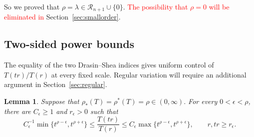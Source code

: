 \documentclass[12pt,letterpaper,reqno]{amsart}
\newtheorem{lem}[thm]{Lemma}
\theoremstyle{definition}
\numberwithin{equation}{section}
\newcommand{\revision}[1]{\textcolor{red}{#1}}
\begin{document}
So we proved that $\rho=\lambda\in {\mathcal R_{n+1}}\cup\{0\}$.
\revision{The possibility that $\rho=0$ will be eliminated in}
Section~\ref{sec:smallorder}.


\subsection{Two-sided power bounds}
\label{sec:power-bounds}

The equality of the two Drasin--Shea indices gives uniform control of
\(T(tr)/T(r)\) at every fixed scale. Regular variation will require an
additional argument in Section~\ref{sec:regular}.

\begin{lem}\label{lem:power-bounds}
Suppose that
$
\rho_*(T)=\rho^*(T)=\rho\in(0,\infty).
$
For every \(0<\epsilon<\rho\), there are
\(C_\epsilon\geq1\) and \(r_\epsilon>0\) such that
\begin{equation}\label{eq:power-bounds}
 C_\epsilon^{-1}
 \min\{t^{\rho-\epsilon},t^{\rho+\epsilon}\}
 \leq
 \frac{T(tr)}{T(r)}
 \leq
 C_\epsilon
 \max\{t^{\rho-\epsilon},t^{\rho+\epsilon}\},
 \qquad
 r,tr\geq r_\epsilon.
\end{equation}
\end{lem}
\end{document}
